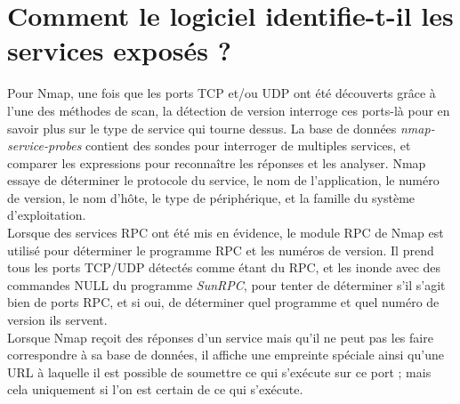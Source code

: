 \section{Comment le logiciel identifie-t-il les services exposés ?}

Pour Nmap, une fois que les ports TCP et/ou UDP ont été découverts grâce à l'une des méthodes de scan, la détection de version interroge ces ports-là pour en savoir plus sur le type de service qui tourne dessus. La base de données \textit{nmap-service-probes} contient des sondes pour interroger de multiples services, et comparer les expressions pour reconnaître les réponses et les analyser. Nmap essaye de déterminer le protocole du service, le nom de l'application, le numéro de version, le nom d'hôte, le type de périphérique, et la famille du système d'exploitation. \\
\indent Lorsque des services RPC ont été mis en évidence, le module RPC de Nmap est utilisé pour déterminer le programme RPC et les numéros de version. Il prend tous les ports TCP/UDP détectés comme étant du RPC, et les inonde avec des commandes NULL du programme \textit{SunRPC}, pour tenter de déterminer s'il s'agit bien de ports RPC, et si oui, de déterminer quel programme et quel numéro de version ils servent. \\
\indent Lorsque Nmap reçoit des réponses d'un service mais qu'il ne peut pas les faire correspondre à sa base de données, il affiche une empreinte spéciale ainsi qu'une URL à laquelle il est possible de soumettre ce qui s'exécute sur ce port ; mais cela uniquement si l'on est certain de ce qui s'exécute.

\begin{comment}
After TCP and/or UDP ports are discovered using one of the other scan methods, version detection interrogates those ports to determine more about what is actually running. The nmap-service-probes database contains probes for querying various services and match expressions to recognize and parse responses. Nmap tries to determine the service protocol (e.g. FTP, SSH, Telnet, HTTP), the application name (e.g. ISC BIND, Apache httpd, Solaris telnetd), the version number, hostname, device type (e.g. printer, router), the OS family (e.g. Windows, Linux).

When RPC services are discovered, the Nmap RPC grinder is automatically used to determine the RPC program and version numbers. It takes all the TCP/UDP ports detected as RPC and floods them with SunRPC program NULL commands in an attempt to determine whether they are RPC ports, and if so, what program and version number they serve up. Thus you can effectively obtain the same info as rpcinfo -p even if the target's portmapper is behind a firewall (or protected by TCP wrappers). Decoys do not currently work with RPC scan.

When Nmap receives responses from a service but cannot match them to its database, it prints out a special fingerprint and a URL for you to submit if to if you know for sure what is running on the port. Please take a couple minutes to make the submission so that your find can benefit everyone. Thanks to these submissions, Nmap has about 6,500 pattern matches for more than 650 protocols such as SMTP, FTP, HTTP, etc.
\end{comment}